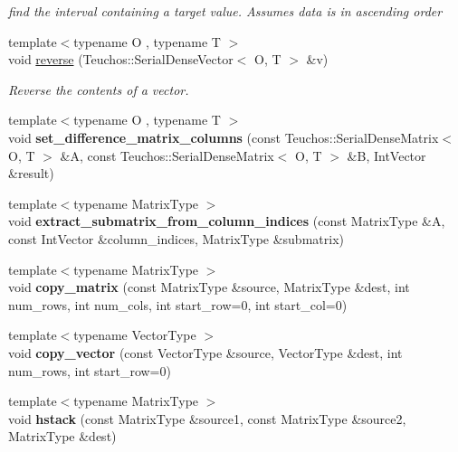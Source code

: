 \begin{DoxyCompactItemize}
\begin{DoxyCompactList}\small\item\em find the interval containing a target value. Assumes data is in ascending order \end{DoxyCompactList}\item 
{\footnotesize template$<$typename O , typename T $>$ }\\void \hyperlink{MathTools_8hpp_aead46682ff85de914142151a1c132a54}{reverse} (Teuchos\+::\+Serial\+Dense\+Vector$<$ O, T $>$ \&v)
\begin{DoxyCompactList}\small\item\em Reverse the contents of a vector. \end{DoxyCompactList}\item 
{\footnotesize template$<$typename O , typename T $>$ }\\void {\bfseries set\+\_\+difference\+\_\+matrix\+\_\+columns} (const Teuchos\+::\+Serial\+Dense\+Matrix$<$ O, T $>$ \&A, const Teuchos\+::\+Serial\+Dense\+Matrix$<$ O, T $>$ \&B, Int\+Vector \&result)\label{MathTools_8hpp_a7d0f50717ee3e565b81d5e37567b219d}

\item 
{\footnotesize template$<$typename Matrix\+Type $>$ }\\void {\bfseries extract\+\_\+submatrix\+\_\+from\+\_\+column\+\_\+indices} (const Matrix\+Type \&A, const Int\+Vector \&column\+\_\+indices, Matrix\+Type \&submatrix)\label{MathTools_8hpp_a0fe073268987984f71dcba546e7485a2}

\item 
{\footnotesize template$<$typename Matrix\+Type $>$ }\\void {\bfseries copy\+\_\+matrix} (const Matrix\+Type \&source, Matrix\+Type \&dest, int num\+\_\+rows, int num\+\_\+cols, int start\+\_\+row=0, int start\+\_\+col=0)\label{MathTools_8hpp_a5a130c2bd6bc39b8d5ea23a19f450531}

\item 
{\footnotesize template$<$typename Vector\+Type $>$ }\\void {\bfseries copy\+\_\+vector} (const Vector\+Type \&source, Vector\+Type \&dest, int num\+\_\+rows, int start\+\_\+row=0)\label{MathTools_8hpp_a0017b38c2c5f60851351c569c56e8fed}

\item 
{\footnotesize template$<$typename Matrix\+Type $>$ }\\void {\bfseries hstack} (const Matrix\+Type \&source1, const Matrix\+Type \&source2, Matrix\+Type \&dest)\label{MathTools_8hpp_a5197f0e751bf76751c2afc32667b5762}


\end{DoxyCompactItemize}
